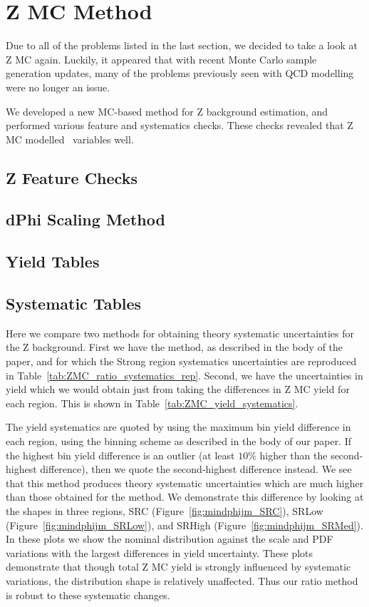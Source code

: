 \section{Z MC Method}

Due to all of the problems listed in the last section, we decided to take a look at Z MC again. Luckily, it appeared that with recent Monte Carlo sample generation updates, many of the problems previously seen with QCD modelling were no longer an issue.

We developed a new MC-based method for Z background estimation, and performed various feature and systematics checks. These checks revealed that Z MC modelled \MET\ variables well.

\subsection*{Z Feature Checks}

\subsection*{dPhi Scaling Method}

\subsection*{Yield Tables}

\subsection*{Systematic Tables}

Here we compare two methods for obtaining theory systematic uncertainties for the Z background. First we have the \mindphijm method, as described in the body of the paper, and for which the Strong region systematics uncertainties are reproduced in Table~\ref{tab:ZMC_ratio_systematics_rep}. Second, we have the uncertainties in yield which we would obtain just from taking the differences in Z MC yield for each region. This is shown in Table~\ref{tab:ZMC_yield_systematics}.

The yield systematics are quoted by using the maximum \mll bin yield difference in each region, using the binning scheme as described in the body of our paper. If the highest bin yield difference is an outlier (at least $10\%$ higher than the second-highest difference), then we quote the second-highest difference instead. We see that this method produces theory systematic uncertainties which are much higher than those obtained for the \mindphijm method. We demonstrate this difference by looking at the \mindphijm shapes in three regions, SRC (Figure~\ref{fig:mindphijm_SRC}), SRLow (Figure~\ref{fig:mindphijm_SRLow}), and SRHigh (Figure~\ref{fig:mindphijm_SRMed}). In these plots we show the nominal \mindphijm distribution against the scale and PDF variations with the largest differences in yield uncertainty. These plots demonstrate that though total Z MC yield is strongly influenced by systematic variations, the \mindphijm distribution shape is relatively unaffected. Thus our \mindphijm ratio method is robust to these systematic changes.

